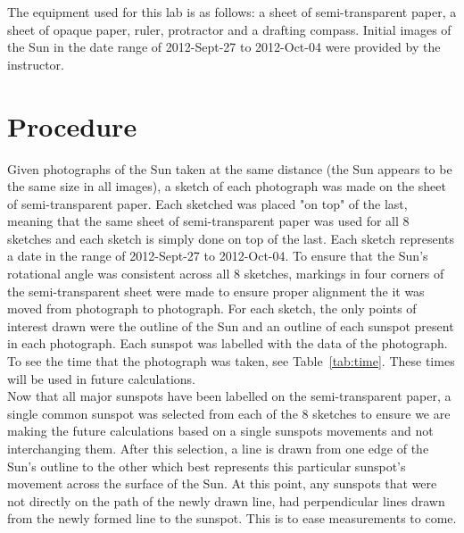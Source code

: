 \documentclass{article}
\begin{document}
The equipment used for this lab is as follows: a sheet of semi-transparent paper,  a sheet of opaque paper, ruler, protractor and
 a drafting compass. Initial images of the Sun in the date range of 2012-Sept-27 to 2012-Oct-04 were provided by the instructor.\\


\section{Procedure}

Given photographs of the Sun taken at the same distance (the Sun appears to be the same size in all images), a sketch of each
photograph was made on the sheet of semi-transparent paper. Each sketched was placed "on top" of the last, meaning that
the same sheet of semi-transparent paper was used for all 8 sketches and each sketch is simply done on top of the last.
Each sketch represents a date in the range of 2012-Sept-27 to 2012-Oct-04.  To
ensure that the Sun's rotational angle was consistent across all 8 sketches, markings in four corners of the semi-transparent
sheet were made to ensure proper alignment the it was moved from photograph to photograph. For each sketch, the only 
points of interest drawn were the outline of the Sun and an outline of each sunspot present in each photograph. Each sunspot
was labelled with the data of the photograph. To see the time that the photograph was taken, see Table~\ref{tab:time}.
These times will be used in future calculations.\\

Now that all major sunspots have been labelled on the semi-transparent paper, a single common sunspot was selected from
each of the 8 sketches to ensure we are making the future calculations based on a single sunspots movements and not
interchanging them. After this selection, a line is drawn from one edge of the Sun's outline to the other which best represents
this particular sunspot's movement across the surface of the Sun. At this point, any sunspots that were not directly on the
path of the newly drawn line, had perpendicular lines drawn from the newly formed line to the sunspot. This is to ease
measurements to come.\\
\end{document}
